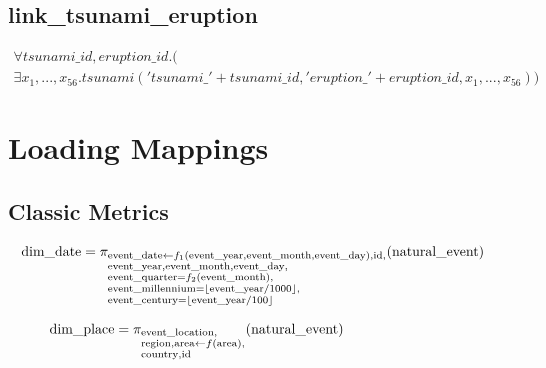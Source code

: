 \documentclass{article}
\begin{document}
\subsection{link\_tsunami\_eruption}

\begin{multline}
\forall tsunami\_id, eruption\_id.(\\
\exists x_1, ..., x_{56}. tsunami('tsunami\_' + tsunami\_id,'eruption\_' +  eruption\_id, x_1, ..., x_{56}))
\end{multline} 


\section{Loading Mappings}

\subsection{Classic Metrics}

\begin{align*}
\text{dim\_date} &= \pi_{\begin{subarray}{l}
                    \text{event\_date} \leftarrow  f_1(\text{event\_year}, \text{event\_month}, \text{event\_day}), 
                    \text{id}, \\
                    \text{event\_year}, 
                    \text{event\_month},
                    \text{event\_day}, \\
                    \text{event\_quarter} = f_2(\text{event\_month}), \\
                    \text{event\_millennium} = \lfloor \text{event\_year} / 1000 \rfloor, \\
                    \text{event\_century} = \lfloor \text{event\_year} / 100 \rfloor
                   \end{subarray}} (\text{natural\_event})
\end{align*}

\begin{align*}
\hspace{-2.8cm} \text{dim\_place} &= \pi_{\begin{subarray}{l}
                    \text{event\_location}, \\
                    \text{region}, 
                    \text{area} \leftarrow  f(\text{area}), \\
                    \text{country}, 
                    \text{id}
                   \end{subarray}} (\text{natural\_event})
\end{align*}
\end{document}
